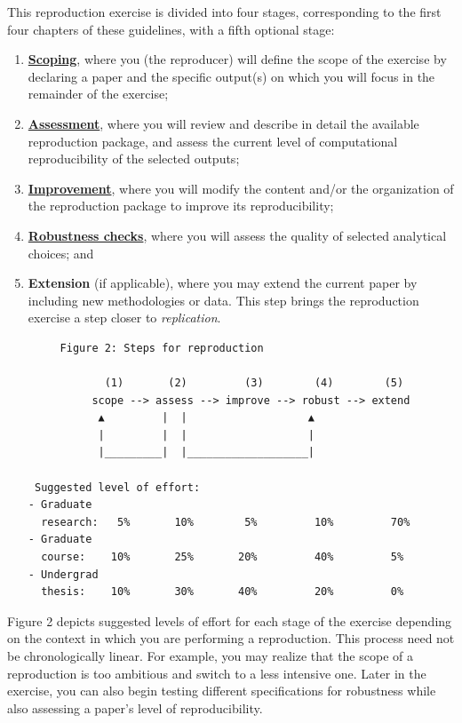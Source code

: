 \documentclass[]{book}
\begin{document}
This reproduction exercise is divided into four stages, corresponding to the first four chapters of these guidelines, with a fifth optional stage:

\begin{enumerate}
\def\labelenumi{\arabic{enumi}.}
\item
  \protect\hyperlink{scoping}{\textbf{Scoping}}, where you (the reproducer) will define the scope of the exercise by declaring a paper and the specific output(s) on which you will focus in the remainder of the exercise;\\
\item
  \protect\hyperlink{assessment}{\textbf{Assessment}}, where you will review and describe in detail the available reproduction package, and assess the current level of computational reproducibility of the selected outputs;
\item
  \protect\hyperlink{improvements}{\textbf{Improvement}}, where you will modify the content and/or the organization of the reproduction package to improve its reproducibility;\\
\item
  \protect\hyperlink{robust}{\textbf{Robustness checks}}, where you will assess the quality of selected analytical choices; and\\
\item
  \textbf{Extension} (if applicable), where you may extend the current paper by including new methodologies or data. This step brings the reproduction exercise a step closer to \emph{replication}.

\begin{verbatim}
     Figure 2: Steps for reproduction

            (1)       (2)         (3)        (4)        (5)
          scope --> assess --> improve --> robust --> extend
           ▲         |  |                   ▲
           |         |  |                   |
           |_________|  |___________________|

 Suggested level of effort:
- Graduate
  research:   5%       10%        5%         10%         70%
- Graduate
  course:    10%       25%       20%         40%         5%
- Undergrad
  thesis:    10%       30%       40%         20%         0%
\end{verbatim}
\end{enumerate}

Figure 2 depicts suggested levels of effort for each stage of the exercise depending on the context in which you are performing a reproduction. This process need not be chronologically linear. For example, you may realize that the scope of a reproduction is too ambitious and switch to a less intensive one. Later in the exercise, you can also begin testing different specifications for robustness while also assessing a paper's level of reproducibility.
\end{document}
